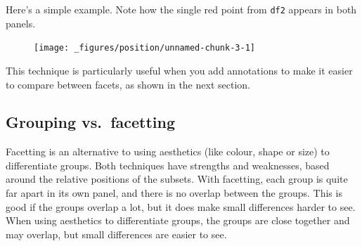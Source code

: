 Here's a simple example. Note how the single red point from \texttt{df2}
appears in both panels.

\begin{Shaded}
\begin{Highlighting}[]
\StringTok{ }\NormalTok{(} \NormalTok{:}\NormalTok{, } \NormalTok{:}\NormalTok{, } \NormalTok{(}\NormalTok{, }\NormalTok{, }\NormalTok{))}
\StringTok{ }\NormalTok{(} \NormalTok{, } \NormalTok{)}

\StringTok{ }
\StringTok{  }\NormalTok{(}  \NormalTok{, } \NormalTok{) +}\StringTok{ }
\StringTok{  }\NormalTok{() +}\StringTok{ }
\StringTok{  }
\end{Highlighting}
\end{Shaded}

\begin{figure}[H]
  \centering
  \texttt{[image: \_figures/position/unnamed-chunk-3-1]}
\end{figure}

This technique is particularly useful when you add annotations to make
it easier to compare between facets, as shown in the next section.

\subsection{Grouping vs.~facetting}\label{sub:group-vs-facet}

Facetting is an alternative to using aesthetics (like colour, shape or
size) to differentiate groups. Both techniques have strengths and
weaknesses, based around the relative positions of the subsets.
  With
facetting, each group is quite far apart in its own panel, and there is
no overlap between the groups. This is good if the groups overlap a lot,
but it does make small differences harder to see. When using aesthetics
to differentiate groups, the groups are close together and may overlap,
but small differences are easier to see.

